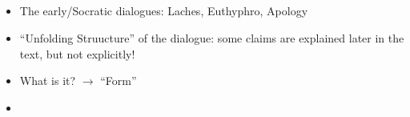 \documentclass[emulatestandardclasses]{scrartcl}
\begin{document}
\subsection{}

\begin{itemize}
  \item The early/Socratic dialogues: Laches, Euthyphro, Apology
  \item "`Unfolding Struucture"' of the dialogue: some claims are explained later in the text, but not explicitly!
  \item What is it? $\rightarrow$ "`Form"'
  \item  
\end{itemize}


\newpage
%


\end{document}
